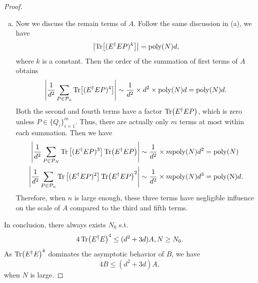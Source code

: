 \documentclass[showpacs,amsmath,amssymb,twocolumn,aps,pra,superscriptaddress,notitlepage,10pt]{revtex4-2}
\newcommand{\cP}{\mathcal P}
\begin{document}
\begin{proof}
\begin{enumerate}[(a)]
\begin{equation}
\begin{aligned}
                &\le 3\sum_{P\in\mathcal P_N}\Tr(E^\dagger EPE^\dagger EP)^2+\Tr(E^\dagger EP)^4\\
                &\le (1+\frac{3}{d})\left(3\sum_{P\in\mathcal P_N}\Tr(E^\dagger EPE^\dagger EP)^2+\Tr(E^\dagger EP)^4\right).
            \end{aligned}
        \end{equation}
\item Now we discuss the remain terms of $A$. Follow the same discussion in (a), we have
	\begin{equation}
		\left|\Tr[(E^\dagger EP)^k]\right|=\mathrm{poly}(N)d,
	\end{equation}
	where $k$ is a constant. Then the order of the summation of first terms of $A$ obtains
	\begin{equation}
		\left|\frac{1}{d^2}\sum_{P\in\cP_n}\Tr[(E^\dagger EP)^4]\right|\sim \frac{1}{d^2}\times d^2\times\mathrm{poly}(N)d=\mathrm{poly}(N)d.
	\end{equation}
	Both the second and fourth terms have a factor $\Tr(E^\dagger EP)$, which is zero unless $P\in\{Q_i\}_{i=1}^m$. Thus, there are actually only $m$ terms at most within each summation. Then we have
	\begin{equation}
		\begin{aligned}
			\left|\frac{1}{d^2}\sum_{P\in\cP_N}\Tr\left[(E^\dagger EP)^3\right]\Tr(E^\dagger EP)\right|&\sim \frac{1}{d^2}\times m\mathrm{poly}(N)d^2=\mathrm{poly}(N)\\
			\left|\frac{1}{d^2}\sum_{P\in\cP_n}\Tr\left[(E^\dagger EP)^2\right]\Tr(E^\dagger EP)^2\right|&\sim \frac{1}{d^2}\times m\mathrm{poly}(N)d^3=\mathrm{poly(N)}d.
		\end{aligned}
	\end{equation}
	Therefore, when $n$ is large enough, these three terms have negligible influence on the scale of $A$ compared to the third and fifth terms.
    \end{enumerate}
	In conclusion, there always exists $N_0$ s.t.
        \begin{equation}
            4\Tr(E^\dagger E)^4\leq(d^2+3d)A\notag, N\geq N_0.
        \end{equation}
        As $\Tr(E^\dagger E)^4$ dominates the asymptotic behavior of $B$, we have
        \begin{equation}
            4B\leq (d^2+3d)A,
        \end{equation}
        when $N$ is large.

\end{proof}
\end{document}
